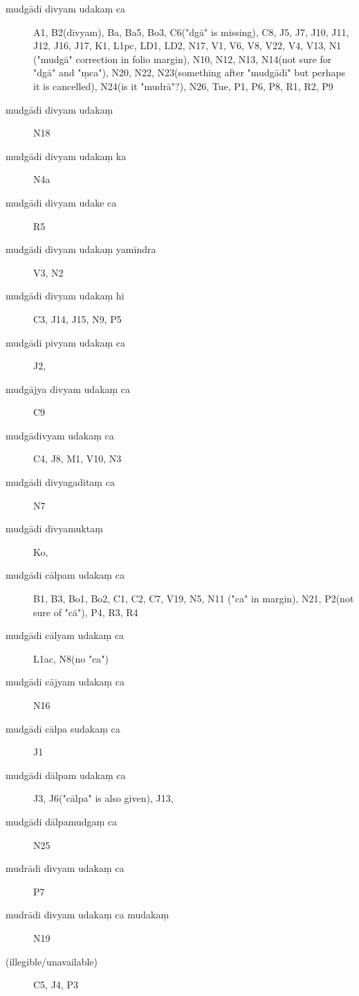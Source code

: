 \begin{ekdosis}
\begin{marma}[hp01_055]
    
    \begin{marma}[hp01_062]
      \begin{description}
      \item[mudgādi divyam udakaṃ ca] A1, B2(dīvyam), Ba, Ba5, Bo3, C6("dgā" is missing), C8, J5, J7, J10, J11, J12, J16, J17, K1, L1pc, LD1, LD2, N17, V1, V6, V8, V22, V4, V13, N1 ("mudgā" correction in folio margin), N10, N12, N13, N14(not sure for "dgā" and "ṃca"), N20, N22, N23(something after "mudgādi" but perhaps it is cancelled), N24(is it "mudrā"?), N26, Tue, P1, P6, P8, R1, R2, P9
      \item[mudgādi divyam udakaṃ]   N18
      \item[mudgādi divyam udakaṃ ka]   N4a
      \item[mudgādi divyam udake ca]   R5
      \item[mudgādi divyam udakaṃ yamīndra]        V3, N2
      \item[mudgādi divyam udakaṃ hi]        C3, J14, J15, N9, P5
      \item[mudgādi pivyam udakaṃ ca]        J2,
      \item[mudgājya divyam udakaṃ ca]        C9
      \item[mudgādivyam udakaṃ ca]        C4, J8, M1, V10, N3
      \item[mudgādi divyagaditaṃ ca]   N7
      \item[mudgādi divyamuktaṃ]        Ko,
      \item[mudgādi cālpam udakaṃ ca]        B1, B3, Bo1, Bo2, C1, C2, C7, V19, N5, N11 ("ca" in margin), N21, P2(not sure of "cā"), P4, R3, R4
      \item[mudgādi cālyam udakaṃ ca]        L1ac, N8(no "ca")
      \item[mudgādi cājyam udakaṃ ca]        N16
      \item[mudgādi cālpa sudakaṃ ca]         J1
      \item[mudgādi dālpam udakaṃ ca]        J3, J6("cālpa" is also given), J13,
      \item[mudgādi dālpamudgaṃ ca]        N25
      \item[mudrādi divyam udakaṃ ca]  P7
      \item[mudrādi divyam udakaṃ ca mudakaṃ]        N19
      \item[(illegible/unavailable)]       C5, J4, P3
      \end{description}


\end{marma}
\end{marma}
\end{ekdosis}
